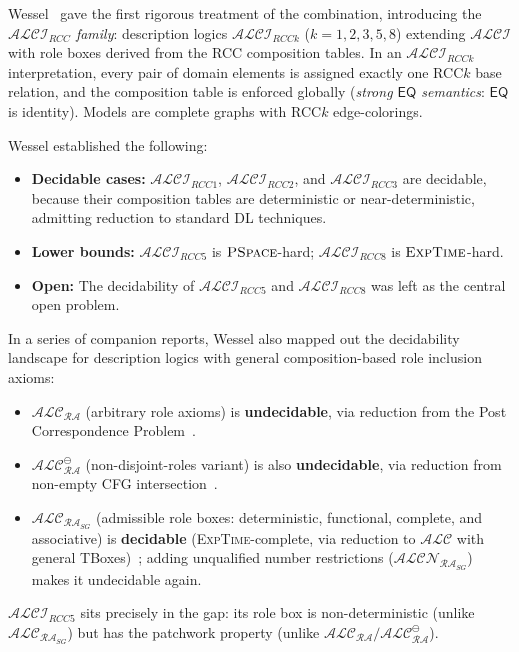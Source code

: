 \documentclass[
]{ceurart}
\theoremstyle{definition}
\newcommand{\ALCI}{\ensuremath{\mathcal{ALCI}}}
\newcommand{\ALC}{\ensuremath{\mathcal{ALC}}}
\newcommand{\ALCIRCC}[1]{\ensuremath{\mathcal{ALCI}_{\mathit{RCC#1}}}}
\newcommand{\EQ}{\ensuremath{\mathsf{EQ}}}
\newcommand{\EXPTIME}{\textsc{ExpTime}}
\newcommand{\PSPACE}{\textsc{PSpace}}
\begin{document}
Wessel~\cite{Wessel2002,Wessel2003,Wessel2001} gave the first rigorous treatment
of the combination, introducing the \emph{$\ALCIRCC{}$ family}:
description logics $\ALCIRCC{k}$ ($k = 1,2,3,5,8$) extending $\ALCI$
with role boxes derived from the RCC composition tables.
In an $\ALCIRCC{k}$ interpretation, every pair of domain elements is
assigned exactly one RCC$k$ base relation, and the composition table
is enforced globally (\emph{strong $\EQ$ semantics}: $\EQ$ is identity).
Models are complete graphs with RCC$k$ edge-colorings.

Wessel established the following:
\begin{itemize}
  \item \textbf{Decidable cases:} $\ALCIRCC{1}$, $\ALCIRCC{2}$,
    and $\ALCIRCC{3}$ are decidable, because their composition
    tables are deterministic or near-deterministic, admitting
    reduction to standard DL techniques.
  \item \textbf{Lower bounds:} $\ALCIRCC{5}$ is $\PSPACE$-hard;
    $\ALCIRCC{8}$ is $\EXPTIME$-hard.
  \item \textbf{Open:} The decidability of $\ALCIRCC{5}$ and
    $\ALCIRCC{8}$ was left as the central open problem.
\end{itemize}

In a series of companion reports, Wessel also mapped out the
decidability landscape for description logics with general
composition-based role inclusion axioms:
\begin{itemize}
  \item $\ALC_{\mathcal{RA}}$ (arbitrary role axioms) is
    \textbf{undecidable}, via reduction from the Post
    Correspondence Problem~\cite{Wessel2001RA}.
  \item $\ALC_{\mathcal{RA}}^\ominus$ (non-disjoint-roles
    variant) is also \textbf{undecidable}, via reduction from
    non-empty CFG intersection~\cite{Wessel2000RA}.
  \item $\ALC_{\mathcal{RA}_{SG}}$ (admissible role boxes:
    deterministic, functional, complete, and associative) is
    \textbf{decidable} (\EXPTIME-complete, via reduction to
    $\ALC$ with general TBoxes)~\cite{Wessel2000SG}; adding
    unqualified number restrictions ($\mathcal{ALCN}_{\mathcal{RA}_{SG}}$)
    makes it undecidable again.
\end{itemize}
$\ALCIRCC{5}$ sits precisely in the gap: its role box is
non-deterministic (unlike $\ALC_{\mathcal{RA}_{SG}}$) but
has the patchwork property (unlike
$\ALC_{\mathcal{RA}}/\ALC_{\mathcal{RA}}^\ominus$).
\end{document}
